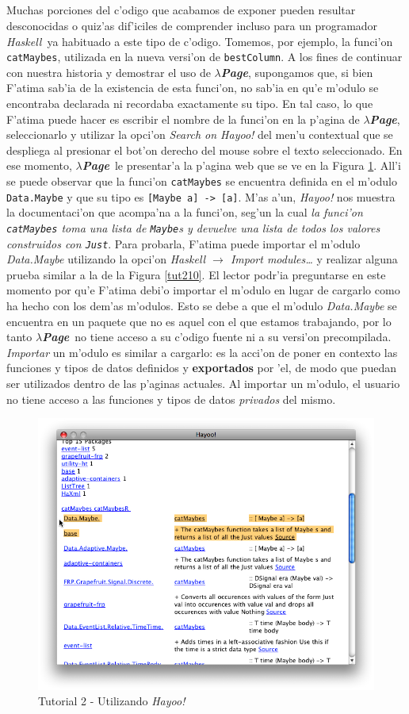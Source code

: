 \documentclass[a4paper]{article}
\newcommand{\haskell}{\textsl{Haskell}}
\newcommand{\hpage}{\textbf{\textsl{$\lambda$Page}}}
\begin{document}
\subparagraph{} Muchas porciones del c'odigo que acabamos de exponer pueden resultar desconocidas o quiz'as dif'iciles de comprender incluso para un programador \haskell\ ya habituado a este tipo de c'odigo.  Tomemos, por ejemplo, la funci'on \texttt{catMaybes}, utilizada en la nueva versi'on de \texttt{bestColumn}.  A los fines de continuar con nuestra historia y demostrar el uso de \hpage, supongamos que, si bien F'atima sab'ia de la existencia de esta funci'on, no sab'ia en qu'e m'odulo se encontraba declarada ni recordaba exactamente su tipo.  En tal caso, lo que F'atima puede hacer es escribir el nombre de la funci'on en la p'agina de \hpage, seleccionarlo y utilizar la opci'on \textsl{Search on Hayoo!} del men'u contextual que se despliega al presionar el bot'on derecho del mouse sobre el texto seleccionado.  En ese momento, \hpage\ le presentar'a la p'agina web que se ve en la Figura \ref{tut209}. All'i se puede observar que la funci'on \texttt{catMaybes} se encuentra definida en el m'odulo \texttt{Data.Maybe} y que su tipo es \texttt{[Maybe a] -> [a]}.  M'as a'un, \textsl{Hayoo!} nos muestra la documentaci'on que acompa'na a la funci'on, seg'un la cual \textit{la funci'on \texttt{catMaybes} toma una lista de \texttt{Maybe}s y devuelve una lista de todos los valores construidos con \texttt{Just}}.  Para probarla, F'atima puede importar el m'odulo \textsl{Data.Maybe} utilizando la opci'on \textsl{Haskell $\rightarrow$ Import modules\ldots} y realizar alguna prueba similar a la de la Figura \ref{tut210}.  El lector podr'ia preguntarse en este momento por qu'e F'atima debi'o importar el m'odulo en lugar de cargarlo como ha hecho con los dem'as m'odulos.  Esto se debe a que el m'odulo \textsl{Data.Maybe} se encuentra en un paquete que no es aquel con el que estamos trabajando, por lo tanto \hpage\ no tiene acceso a su c'odigo fuente ni a su versi'on precompilada.  \textsl{Importar} un m'odulo es similar a cargarlo: es la acci'on de poner en contexto las funciones y tipos de datos definidos y \textbf{exportados} por 'el, de modo que puedan ser utilizados dentro de las p'aginas actuales.  Al importar un m'odulo, el usuario no tiene acceso a las funciones y tipos de datos \textsl{privados} del mismo.
\begin{figure}[hp]
	\begin{center}
        	\includegraphics[width=.75\textwidth]{pictures/tut2/09}
		\caption{Tutorial 2 - Utilizando \textsl{Hayoo!}}
		\label{tut209}
	\end{center}
\end{figure}
\end{document}
